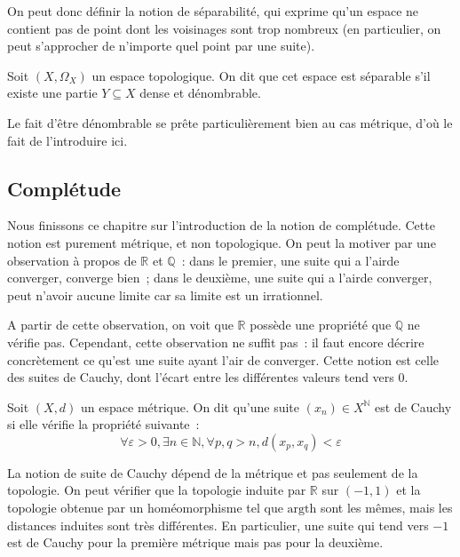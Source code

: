 On peut donc définir la notion de séparabilité, qui exprime qu'un espace ne
contient pas de point dont les voisinages sont trop nombreux (en particulier, on
peut s'approcher de n'importe quel point par une suite).

\begin{definition}
  Soit $(X,\Omega_X)$ un espace topologique. On dit que cet espace est
  séparable s'il existe une partie $Y\subseteq X$ dense et dénombrable.
\end{definition}

Le fait d'être dénombrable se prête particulièrement bien au cas métrique,
d'où le fait de l'introduire ici.

\subsection{Complétude}

Nous finissons ce chapitre sur l'introduction de la notion de complétude. Cette
notion est purement métrique, et non topologique. On peut la motiver par une
observation à propos de $\mathbb R$ et $\mathbb Q$~: dans le premier, une
suite qui \og a l'air\fg de converger, converge bien~; dans le deuxième,
une suite qui \og a l'air\fg de converger, peut n'avoir aucune limite car sa
limite est un irrationnel.

A partir de cette observation, on voit que $\mathbb R$ possède une propriété que
$\mathbb Q$ ne vérifie pas. Cependant, cette observation ne suffit pas~: il faut
encore décrire concrètement ce qu'est une suite ayant l'air de converger. Cette
notion est celle des suites de Cauchy, dont l'écart entre les différentes
valeurs tend vers $0$.

\begin{definition}
  Soit $(X,d)$ un espace métrique. On dit qu'une suite $(x_n)\in X^\mathbb N$
  est de Cauchy si elle vérifie la propriété suivante~:
  \[\forall \varepsilon > 0, \exists n \in \mathbb N, \forall p,q > n,
  d(x_p,x_q) < \varepsilon\]
\end{definition}

\begin{remark}
  La notion de suite de Cauchy dépend de la métrique et pas seulement de la
  topologie. On peut vérifier que la topologie induite par $\mathbb R$ sur
  $(-1,1)$ et la topologie obtenue par un homéomorphisme tel que
  $\mathrm{argth}$ sont les mêmes, mais les distances induites sont très
  différentes. En particulier, une suite qui tend vers $-1$ est de Cauchy pour
  la première métrique mais pas pour la deuxième.
\end{remark}

